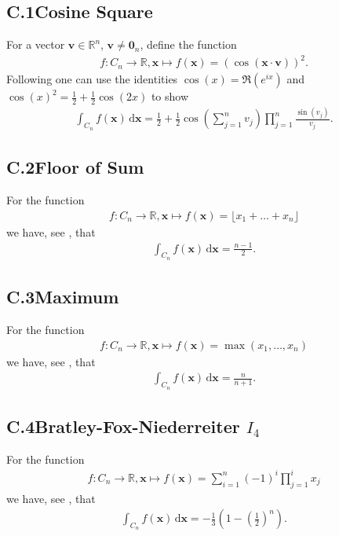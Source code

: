 \documentclass[11pt]{article}
\def\R{\mathbb{R}}
\def\bfx{\bm{x}}
\def\bfv{\bm{v}}
\def\d{\,\mathrm{d}}
\def\bx{\mathbf{x}}
\begin{document}
\subsection*{C.1\hspace{0.5cm}Cosine Square}
For a vector $\bfv\in\R^n$, $\bfv\neq \mathbf{0}_n$, define the function
\begin{align*}
f\colon C_{n}\to\R, \bx \mapsto f(\bx) = (\cos\left(\bfx\cdot\bfv\right))^2.
\end{align*}
Following \cite{IntegralCos2} one can use the identities $\cos(x)=\Re(e^{ix})$ and $\cos(x)^2 = \frac{1}{2}+\frac{1}{2}\cos(2x)$ to show
\begin{align*}
\int_{C_{n}} f(\bx) \d\bx =\frac{1}{2}+\frac{1}{2}\cos\left(\sum_{j=1}^{n}v_j\right)\prod_{j=1}^{n}\frac{\sin(v_j)}{v_j}.
\end{align*}
%
%
%
\subsection*{C.2\hspace{0.5cm}Floor of Sum}
For the function
\begin{align*}
f\colon C_{n}\to\R, \bx \mapsto f(\bx) = \lfloor x_1 + \ldots + x_n \rfloor
\end{align*}
we have, see \cite{IntegralFloorCube}, that
\begin{align*}
\int_{C_{n}} f(\bx) \d\bx = \frac{n-1}{2}.
\end{align*}
%
%
\subsection*{C.3\hspace{0.5cm}Maximum}
For the function
\begin{align*}
f\colon C_{n}\to\R, \bx \mapsto f(\bx) = \max(x_1,\ldots,x_n)
\end{align*}
we have, see \cite{IntegralCubeMax}, that
\begin{align*}
\int_{C_{n}} f(\bx) \d\bx = \frac{n}{n+1}.
\end{align*}
%
%
\subsection*{C.4\hspace{0.5cm}Bratley-Fox-Niederreiter $I_4$}
For the function
\begin{align*}
f\colon C_{n}\to\R, \bx \mapsto f(\bx) = \sum^{n}_{i=1} (-1)^i \prod_{j=1}^{i} x_j
\end{align*}
we have, see \cite{BratleyFoxNiederreiter1992}, that
\begin{align*}
\int_{C_{n}} f(\bx) \d\bx = -\frac{1}{3}\left(1-\left(\frac{1}{2}\right)^n\right).
\end{align*}
%
%
\end{document}

